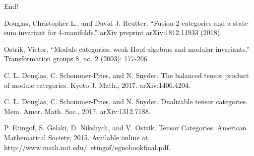 \documentclass{beamer}
\begin{document}
\begin{frame}

\begin{center}
\Huge End!
\end{center}

\end{frame}

\begin{frame}
\begin{thebibliography}{1}

 Douglas, Christopher L., and David J. Reutter. ``Fusion
2-categories and a state-sum invariant for 4-manifolds.'' arXiv preprint arXiv:1812.11933 (2018).

 Ostrik, Victor. ``Module categories, weak Hopf algebras and
modular invariants.'' Transformation groups 8, no. 2 (2003): 177-206.

 C. L. Douglas, C. Schommer-Pries, and N. Snyder. The balanced tensor product of module
categories. Kyoto J. Math., 2017. arXiv:1406.4204.

 C. L. Douglas, C. Schommer-Pries, and N. Snyder. Dualizable tensor categories. Mem. Amer.
Math. Soc., 2017. arXiv:1312.7188.

 P. Etingof, S. Gelaki, D. Nikshych, and V. Ostrik. Tensor Categories. American Mathematical
Society, 2015. Available online at http://www.math.mit.edu/~etingof/egnobookfinal.pdf.

\end{thebibliography}
\end{frame}
\end{document}

